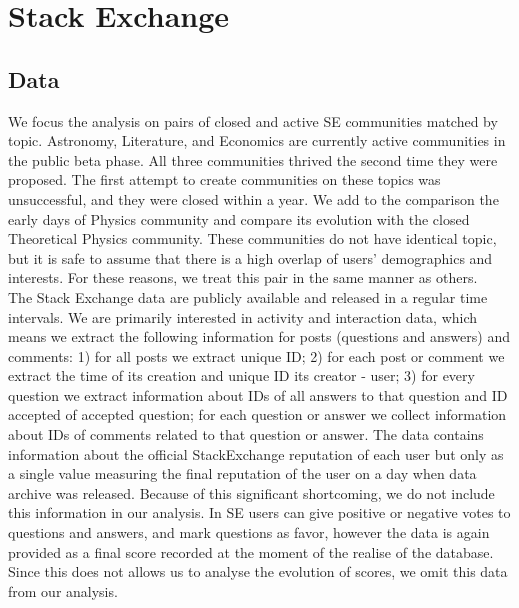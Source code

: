 

\chapter{Stack Exchange} %

\label{Chapter3}

\section{Data \label{sec:data}}

We focus the analysis on pairs of closed and active SE communities matched by topic. Astronomy, Literature, and Economics are currently active communities in the public beta phase. All three communities thrived the second time they were proposed. The first attempt to create communities on these topics was unsuccessful, and they were closed within a year. We add to the comparison the early days of Physics community and compare its evolution with the closed Theoretical Physics community. These communities do not have identical topic, but it is safe to assume that there is a high overlap of users' demographics and interests. For these reasons, we treat this pair in the same manner as others.\\ 
The Stack Exchange data are publicly available and released in a regular time intervals. We are primarily interested in activity and interaction data, which means we extract the following information for posts (questions and answers) and comments: 1) for all posts we extract unique ID; 2) for each post or comment we extract the time of its creation and unique ID its creator - user; 3) for every question we extract information about IDs of all answers to that question and ID accepted of accepted question; for each question or answer we collect information about IDs of comments related to that question or answer. The data contains information about the official StackExchange reputation of each user but only as a single value measuring the final reputation of the user on a day when data archive was released. Because of this significant shortcoming, we do not include this information in our analysis. In SE users can give positive or negative votes to questions and answers, and mark questions as favor, however the data is again provided as a final score recorded at the moment of the realise of the database. Since this does not allows us to analyse the evolution of scores, we omit this data from our analysis.\\




